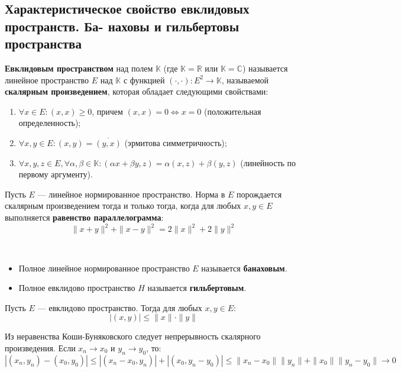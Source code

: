 \subsection{Характеристическое свойство евклидовых пространств. Ба-
	наховы и гильбертовы пространства}
\begin{definition}
	\textbf{Евклидовым пространством} над полем $\mathbb{K}$ (где $\mathbb{K} = \mathbb{R}$ или $\mathbb{K} = \mathbb{C}$) называется линейное пространство $E$ над $\mathbb{K}$ с функцией $(\cdot, \cdot) : E^2 \to \mathbb{K}$, называемой \textbf{скалярным произведением}, которая обладает следующими свойствами:
	\begin{enumerate}
		\item $\forall x \in E: (x, x) \geqslant 0$, причем $(x, x) = 0 \Leftrightarrow x = 0$ (положительная определенность);
		\item $\forall x, y \in E: (x, y) = \overline{(y, x)}$ (эрмитова симметричность);
		\item $\forall x, y, z \in E, \forall \alpha, \beta \in \mathbb{K}: (\alpha x + \beta y, z) = \alpha(x, z) + \beta(y, z)$ (линейность по первому аргументу).
	\end{enumerate}
\end{definition}

\begin{theorem}
	Пусть $E$ --- линейное нормированное пространство. Норма в $E$ порождается скалярным произведением тогда и только тогда, когда для любых $x, y \in E$ выполняется \textbf{равенство параллелограмма}:
	\[\|x+y\|^2 + \|x-y\|^2 = 2\|x\|^2 + 2\|y\|^2\]
\end{theorem}


\begin{definition}~
	\begin{itemize}
		\item Полное линейное нормированное пространство $E$ называется \textbf{банаховым}.
		\item Полное евклидово пространство $H$ называется \textbf{гильбертовым}.
	\end{itemize}
\end{definition}

\begin{corollary}
	Пусть $E$ --- евклидово пространство. Тогда для любых $x, y \in E$:
	\[|(x, y)| \leqslant \|x\| \cdot \|y\|\]
\end{corollary}

\begin{corollary}
	Из неравенства Коши-Буняковского следует непрерывность скалярного произведения. Если $x_n \to x_0$ и $y_n \to y_0$, то:
	\[ |(x_n, y_n) - (x_0, y_0)| \leqslant |(x_n - x_0, y_n)| + |(x_0, y_n - y_0)| \leqslant \|x_n - x_0\|\|y_n\| + \|x_0\|\|y_n - y_0\| \to 0 \]
\end{corollary}